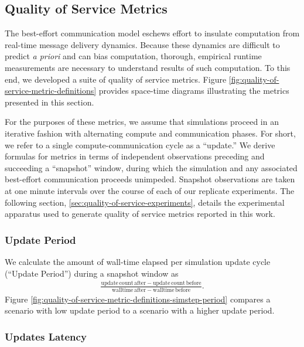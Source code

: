 \subsection{Quality of Service Metrics} \label{sec:quality-of-service-metrics}



The best-effort communication model eschews effort to insulate computation from real-time message delivery dynamics.
Because these dynamics are difficult to predict \textit{a priori} and can bias computation, thorough, empirical runtime measurements are necessary to understand results of such computation.
To this end, we developed a suite of quality of service metrics.
Figure \ref{fig:quality-of-service-metric-definitions} provides space-time diagrams illustrating the metrics presented in this section.

For the purposes of these metrics, we assume that simulations proceed in an iterative fashion with alternating compute and communication phases.
For short, we refer to a single compute-communication cycle as a ``update.''
We derive formulas for metrics in terms of independent observations preceding and succeeding a ``snapshot'' window, during which the simulation and any associated best-effort communication proceeds unimpeded.
Snapshot observations are taken at one minute intervals over the course of each of our replicate experiments.
The following section, \ref{sec:quality-of-service-experiments}, details the experimental apparatus used to generate quality of service metrics reported in this work.

\subsubsection{Update Period} \label{sec:simstep-period-metric}

We calculate the amount of wall-time elapsed per simulation update cycle (``Update Period'') during a snapshot window as
\begin{align*}
\frac{
  \mathrm{update\,count\,after} - \mathrm{update\,count\,before}
}{
  \mathrm{walltime\,after} - \mathrm{walltime\,before}
}.
\end{align*}
Figure \ref{fig:quality-of-service-metric-definitions-simstep-period} compares a scenario with low update period to a scenario with a higher update period.

\subsubsection{Updates Latency} \label{sec:wall-time-latency-metric}

